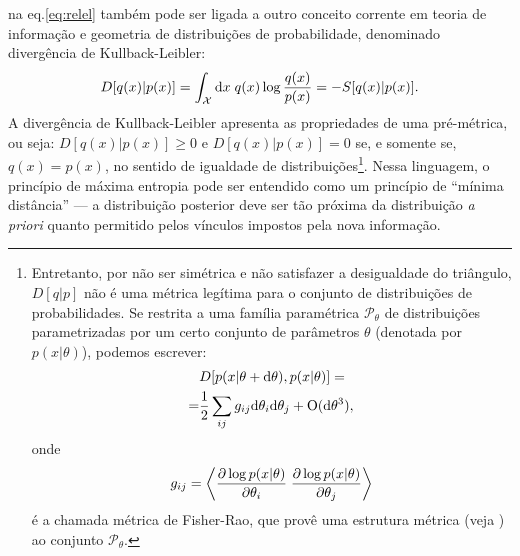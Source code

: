  na eq.\eqref{eq:relel} também pode ser ligada a outro conceito corrente em teoria de informação e geometria de distribuições de probabilidade, denominado divergência de Kullback-Leibler\cite{Amari2000}:
\begin{equation}
\label{eq:kldiv}
 D[q(x) | p(x)] = \int_{\mathcal{X}} \ud x\; q(x) \log\frac{q(x)}{p(x)} = - S[q(x) | p(x)].
\end{equation}
A divergência de Kullback-Leibler apresenta as propriedades de uma pré-métrica, ou seja:  $D[q(x) | p(x)]\ge 0$ e $ D[q(x) | p(x)] = 0$ se, e somente se, $q(x) = p(x)$, no sentido de igualdade de distribuições\footnote{Entretanto, por não ser simétrica e não satisfazer a desigualdade do triângulo, $D[q|p]$ não é uma métrica legítima para o conjunto de distribuições de probabilidades. Se restrita a uma família paramétrica  $\mathcal{P}_\theta$ de distribuições parametrizadas por um certo conjunto de parâmetros $\theta$ (denotada por $p(x|\theta)$), podemos escrever:
\begin{align}
 &D[p(x|\theta+\mathrm{d}\theta), p(x|\theta)] =\nonumber \\= &\frac{1}{2}\sum_{ij} g_{ij} \mathrm{d}\theta_i \mathrm{d}\theta_j + \mathrm{O}(\mathrm{d}\theta^3),\nonumber
\end{align}
onde \[g_{ij} = \left\langle  \frac{\partial \log p(x|\theta)}{\partial \theta_i}\;\frac{\partial \log p(x|\theta)}{\partial \theta_j} \right\rangle\] é a chamada métrica de Fisher-Rao, que provê uma estrutura métrica (veja \citet{Amari2000}) ao conjunto $\mathcal{P}_\theta$.}. Nessa linguagem, o princípio de máxima entropia pode ser entendido como um princípio de ``mínima distância'' --- a distribuição posterior deve ser tão próxima da distribuição \emph{a priori} quanto permitido pelos vínculos impostos pela nova informação. 

